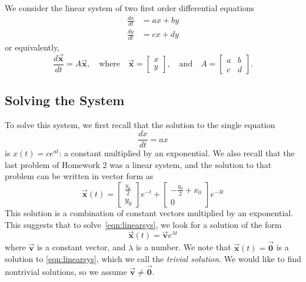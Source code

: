 \documentclass[reqno]{immbook}
\newcommand{\BV}{\vec{\textbf{v}}}
\newcommand{\BX}{\vec{\textbf{x}}}
\newcommand{\BZero}{\vec{\textbf{0}}}  %
\numberwithin{equation}{chapter}
\numberwithin{question}{section}
\numberwithin{theorem}{chapter}
\numberwithin{figure}{chapter}
\theoremstyle{definition}
\begin{document}
We consider the linear system of two first order
differential equations
\begin{equation}
\begin{split}
  \frac{dx}{dt} & = ax + by \\
  \frac{dy}{dt} & = cx + dy
\end{split}
\end{equation}
or equivalently,
\begin{equation}
  \frac{d\BX}{dt} = A\BX, \quad \textrm{where} \quad
     \BX = \begin{bmatrix} x \\ y \end{bmatrix},
     \quad \textrm{and} \quad
     A = \begin{bmatrix} a & b \\ c & d \end{bmatrix}.
\label{eqn:linearsys}
\end{equation}

\subsection*{Solving the System}
To solve this system, we first recall that the solution to the
single equation
\begin{equation}
  \frac{dx}{dt} = a x
\end{equation}
is $x(t) = c e^{at}$: a constant multiplied by
an exponential.  We also recall that the last problem of Homework 2
was a linear system, and the solution to that problem can be
written in vector form as
\begin{equation}
 \BX(t) = \begin{bmatrix} \frac{y_0}{2} \\ y_0 \end{bmatrix} e^{-t}
            +\begin{bmatrix} -\frac{y_0}{2}+x_0 \\ 0 \end{bmatrix} e^{-3t}
\end{equation}
This solution is a combination of constant vectors
multiplied by an exponential.
This suggests that to solve~\eqref{eqn:linearsys},
we look for a solution of the form
\begin{equation}
  \BX(t) = \BV e^{\lambda t}
\end{equation}
where $\BV$ is a constant vector, and $\lambda$ is a number.
We note that $\BX(t) = \BZero$ is a solution to \eqref{eqn:linearsys},
which we call the \emph{trivial solution}.
We would like to
find nontrivial solutions, so we assume $\BV\ne \BZero$.
\end{document}
